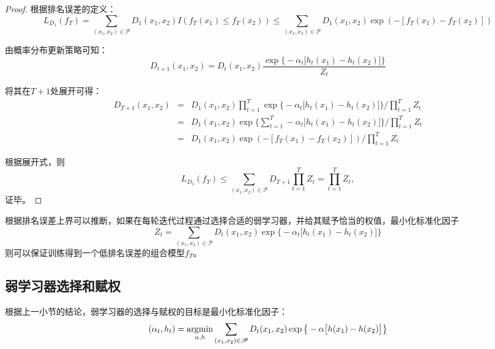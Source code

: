 \begin{proof}
根据排名误差的定义：
\begin{equation}
    L_{D_1}(f_T) = \sum\limits_{(x_1,x_2)\in \mathscr P} D_1(x_1,x_2) I(f_T(x_1) \le f_T(x_2)) \le \sum\limits_{(x_1,x_2)\in \mathscr P} D_1(x_1,x_2) \exp(-[f_T(x_1) - f_T(x_2)])
\end{equation}

由概率分布更新策略可知：
\begin{equation}
  D_{t+1}(x_1,x_2) = D_t(x_1,x_2) \frac{\exp\big\{-\alpha_t \big[h_t(x_1) - h_t(x_2)\big]\big\}}{Z_t}
\end{equation}

将其在$T+1$处展开可得：
\begin{equation}
    \begin{array}{lll}
      D_{T+1}(x_1,x_2) & = & D_1(x_1,x_2) \prod\limits_{t=1}^T \exp\big\{-\alpha_t \big[h_t(x_1) - h_t(x_2)\big]\big\}/\prod\limits_{t=1}^T  Z_t \\
       & = & D_1(x_1,x_2) \exp\big\{\sum\limits_{t=1}^T -\alpha_t \big[h_t(x_1) - h_t(x_2)\big]\big\}/\prod\limits_{t=1}^T  Z_t\\
       & = & D_1(x_1,x_2) \exp(-[f_T(x_1) - f_T(x_2)])/\prod\limits_{t=1}^T  Z_t
    \end{array}
\end{equation}

根据展开式，则
\begin{equation}
    L_{D_1}(f_T) \le \sum\limits_{(x_1,x_2)\in \mathscr P} D_{T+1} \prod\limits_{t=1}^T  Z_t = \prod\limits_{t=1}^T  Z_t,
\end{equation}
证毕。
\end{proof}

根据排名误差上界可以推断，如果在每轮迭代过程通过选择合适的弱学习器，并给其赋予恰当的权值，最小化标准化因子
\begin{equation}
    Z_t = \sum\limits_{(x_1,x_2)\in \mathscr P} D_t(x_1,x_2)\exp\big\{-\alpha_t \big[h_t(x_1) - h_t(x_2)\big]\big\}
\end{equation}
则可以保证训练得到一个低排名误差的组合模型$f_T$。

\subsection{弱学习器选择和赋权}
根据上一小节的结论，弱学习器的选择与赋权的目标是最小化标准化因子：
\begin{equation}
    (\alpha_t, h_t) = \operatorname*{\mathrm{\arg\!\min}}\limits_{\alpha, h} \sum\limits_{(x_1,x_2)\in \mathscr P} D_t(x_1,x_2) \exp\big\{-\alpha \big[h(x_1) - h(x_2)\big]\big\}
\end{equation}

